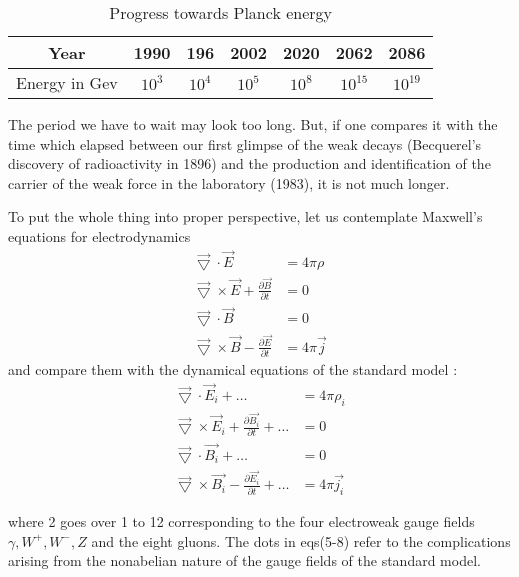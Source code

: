 \vspace{.2cm}

\begin{table}[h]
\caption{Progress towards Planck energy}
\begin{tabular}{|c|c|c|c|c|c|c|}
\hline
Year & 1990 & 196 & 2002 & 2020 & 2062 & 2086\\
\hline
Energy in Gev & $10^{3}$ & $10^{4}$ & $10^{5}$ & $10^{8}$ & $10^{15}$ & $10^{19}$\\
\hline
\end{tabular}
\end{table}



The period we have to wait may look too long. But, if one compares it with the
time which elapsed between our first glimpse of the weak decays (Becquerel’s discovery
of radioactivity in 1896) and the production and identification of the carrier of the weak
force in the laboratory (1983), it is not much longer.

To put the whole thing into proper perspective, let us contemplate Maxwell’s equations
for electrodynamics
\begin{align}
\overrightarrow{\bigtriangledown} \cdot  \overrightarrow{E} &=4 \pi \rho\\
\overrightarrow{\bigtriangledown} \times \overrightarrow{E} + \frac{\partial \overrightarrow{B}}{\partial t} &=0\\
\overrightarrow{\bigtriangledown} \cdot  \overrightarrow{B} &=0\\
\overrightarrow{\bigtriangledown} \times \overrightarrow{B} - \frac{\partial \overrightarrow{E}}{\partial t} &= 4 \pi \overrightarrow{j} 
\end{align}
and compare them with the dynamical equations of the standard model :
\begin{align}
\overrightarrow{\bigtriangledown} \cdot  \overrightarrow{E}_{i} + \ldots &=4 \pi \rho_{i}\\
\overrightarrow{\bigtriangledown} \times \overrightarrow{E}_{i} + \frac{\partial \overrightarrow{B_{i}}}{\partial t} + \ldots &=0\\
\overrightarrow{\bigtriangledown} \cdot  \overrightarrow{B_{i}}+ \ldots &=0\\
\overrightarrow{\bigtriangledown} \times \overrightarrow{B_{i}} - \frac{\partial \overrightarrow{E_{i}}}{\partial t} + \ldots &= 4 \pi \overrightarrow{j_{i}} 
\end{align}

where 2 goes over 1 to 12 corresponding to the four electroweak gauge fields $\gamma, W^{+}, W^{-},Z$
and the eight gluons. The dots in eqs(5-8) refer to the complications arising from the
nonabelian nature of the gauge fields of the standard model.


